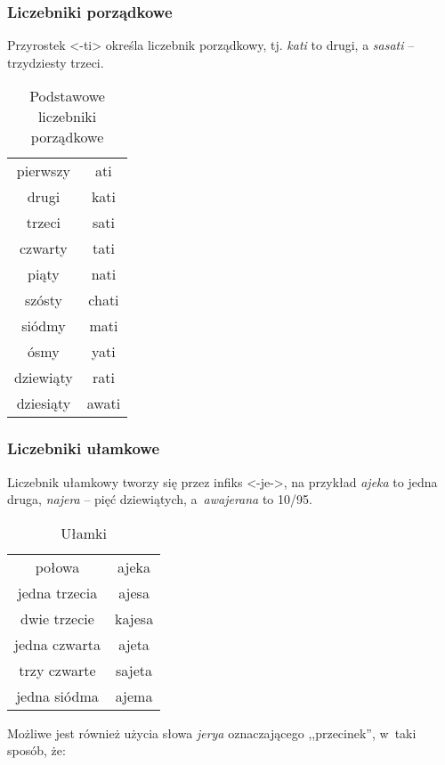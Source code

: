 \begin{spacing}{1.1}
\subsubsection{Liczebniki porządkowe}

Przyrostek <-ti> określa liczebnik porządkowy, tj. \emph{kati} to drugi, 
a \emph{sasati} -- trzydziesty trzeci.

\begin{table}[h]
\centering
\caption{Podstawowe liczebniki porządkowe}
\begin{tabular}{cc} \toprule
	pierwszy & ati \\
	drugi & kati \\
	trzeci & sati \\
	czwarty & tati \\
	piąty & nati \\
	szósty & chati \\
	siódmy & mati \\
	ósmy & yati \\
	dziewiąty & rati \\
	dziesiąty & awati \\\bottomrule
\end{tabular}
\label{tab:chars}
\end{table}

\subsubsection{Liczebniki ułamkowe}

Liczebnik ułamkowy tworzy się przez infiks <-je->, na przykład \emph{ajeka} to 
jedna druga, \emph{najera} -- pięć dziewiątych, a~\emph{awajerana} to 10/95.

\begin{table}[h]
	\centering
	\caption{Ułamki}
	\begin{tabular}{cc} \toprule
		połowa & ajeka \\
		jedna trzecia & ajesa \\
		dwie trzecie & kajesa \\
		jedna czwarta & ajeta \\
		trzy czwarte & sajeta \\
		jedna siódma & ajema  \\\bottomrule
	\end{tabular}
	\label{tab:chars}
\end{table}

Możliwe jest również użycia słowa \emph{jerya} oznaczającego ,,przecinek'', w~taki
sposób, że:


\end{spacing}
